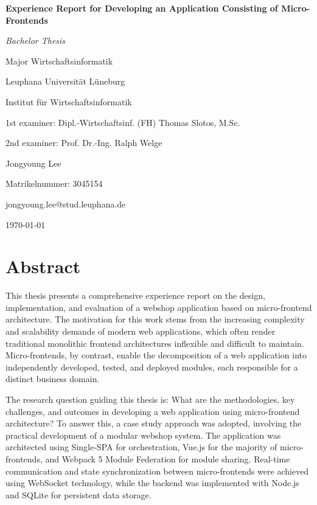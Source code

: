 \documentclass[12pt,a4paper]{report}
\begin{document}
\begin{titlepage}
    \centering
    \vspace*{2cm}
    {\Huge\bfseries Experience Report for Developing an Application Consisting of Micro-Frontends\par}
    \vspace{1cm}
    {\Large\itshape Bachelor Thesis\par}
    \vspace{2cm}
    {\large Major Wirtschaftsinformatik\par}
    {\large Leuphana Universität Lüneburg\par}
    {\large Institut für Wirtschaftsinformatik\par}
    \vspace{1cm}
    {\large 1st examiner: Dipl.-Wirtschaftsinf. (FH) Thomas Slotos, M.Sc.\par}
    {\large 2nd examiner: Prof. Dr.-Ing. Ralph Welge\par}
    \vspace{1cm}
    {\Large Jongyoung Lee\par}
    {\large Matrikelnummer: 3045154\par}
    {\large jongyoung.lee@stud.leuphana.de \par}
    \vspace{2cm}
    {\large \today\par}
    \vfill
\end{titlepage}

\chapter*{Abstract}
This thesis presents a comprehensive experience report on the design, implementation, and evaluation of a webshop application based on micro-frontend architecture. The motivation for this work stems from the increasing complexity and scalability demands of modern web applications, which often render traditional monolithic frontend architectures inflexible and difficult to maintain. Micro-frontends, by contrast, enable the decomposition of a web application into independently developed, tested, and deployed modules, each responsible for a distinct business domain.

The research question guiding this thesis is: What are the methodologies, key challenges, and outcomes in developing a web application using micro-frontend architecture? To answer this, a case study approach was adopted, involving the practical development of a modular webshop system. The application was architected using Single-SPA for orchestration, Vue.js for the majority of micro-frontends, and Webpack 5 Module Federation for module sharing. Real-time communication and state synchronization between micro-frontends were achieved using WebSocket technology, while the backend was implemented with Node.js and SQLite for persistent data storage.
\end{document}
